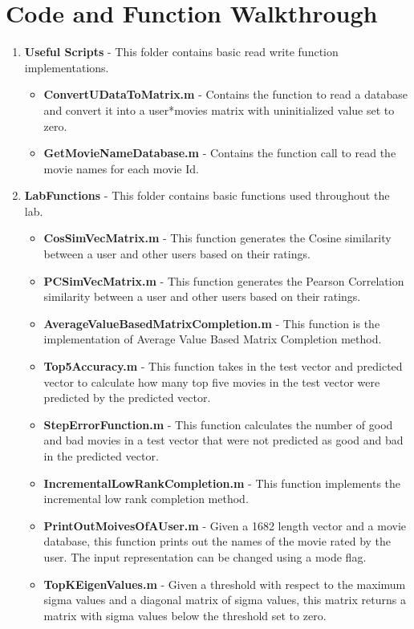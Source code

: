 \section{Code and Function Walkthrough}
\begin{enumerate}
\item \textbf{Useful Scripts} - This folder contains basic read write function implementations.
\begin{itemize}
\item \textbf{ConvertUDataToMatrix.m} - Contains the function to read a database and convert it into a user*movies matrix with uninitialized value set to zero.
\item \textbf{GetMovieNameDatabase.m} - Contains the function call to read the movie names for each movie Id.
\end{itemize}
\item \textbf{LabFunctions} - This folder contains basic functions used throughout the lab.
\begin{itemize}
\item \textbf{CosSimVecMatrix.m} - This function generates the Cosine similarity between a user and other users based on their ratings.
\item \textbf{PCSimVecMatrix.m} - This function generates the Pearson Correlation similarity between a user and other users based on their ratings.
\item \textbf{AverageValueBasedMatrixCompletion.m} - This function is the implementation of Average Value Based Matrix Completion method.
\item \textbf{Top5Accuracy.m} - This function takes in the test vector and predicted vector to calculate how many top five movies in the test vector were predicted by the predicted vector.
\item \textbf{StepErrorFunction.m} - This function calculates the number of good and bad movies in a test vector that were not predicted as good and bad in the predicted vector.
\item \textbf{IncrementalLowRankCompletion.m} - This function implements the incremental low rank completion method.
\item \textbf{PrintOutMoivesOfAUser.m} - Given a 1682 length vector and a movie database, this function prints out the names of the movie rated by the user. The input representation can be changed using a mode flag.
\item \textbf{TopKEigenValues.m} - Given a threshold with respect to the maximum sigma values and a diagonal matrix of sigma values, this matrix returns a matrix with sigma values below the threshold set to zero.

\end{itemize}
\end{enumerate}
